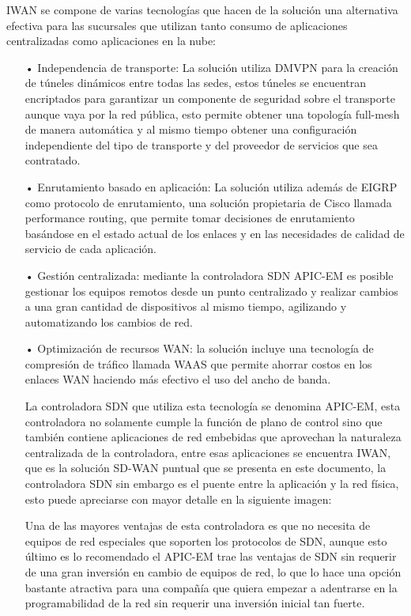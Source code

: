 IWAN se compone de varias tecnologías que hacen de la solución una alternativa efectiva para las sucursales que utilizan tanto consumo de aplicaciones centralizadas como aplicaciones en la nube:


\begin{itemize}
\item[•]Independencia de transporte: La solución utiliza DMVPN para la creación de túneles dinámicos entre todas las sedes, estos túneles se encuentran encriptados para garantizar un componente de seguridad sobre el transporte aunque vaya por la red pública, esto permite obtener una topología full-mesh de manera automática y al mismo tiempo obtener una configuración independiente del tipo de transporte y del proveedor de servicios que sea contratado.
\item[•]Enrutamiento basado en aplicación: La solución utiliza además de EIGRP como protocolo de enrutamiento, una solución propietaria de Cisco llamada performance routing, que permite tomar decisiones de enrutamiento basándose en el estado actual de los enlaces y en las necesidades de calidad de servicio de cada aplicación.
\item[•]Gestión centralizada: mediante la controladora SDN APIC-EM es posible gestionar los equipos remotos desde un punto centralizado y realizar cambios a una gran cantidad de dispositivos al mismo tiempo, agilizando y automatizando los cambios de red.
\item[•]Optimización de recursos WAN: la solución incluye una tecnología de compresión de tráfico llamada WAAS que permite ahorrar costos en los enlaces WAN haciendo más efectivo el uso del ancho de banda.

La controladora SDN que utiliza esta tecnología se denomina APIC-EM, esta controladora no solamente cumple la función de plano de control sino que también contiene aplicaciones de red embebidas que aprovechan la naturaleza centralizada de la controladora, entre esas aplicaciones se encuentra IWAN, que es la solución SD-WAN puntual que se presenta en este documento, la controladora SDN sin embargo es el puente entre la aplicación y la red física, esto puede apreciarse con mayor detalle en la siguiente imagen:


Una de las mayores ventajas de esta controladora es que no necesita de equipos de red especiales que soporten los protocolos de SDN, aunque esto último es lo recomendado el APIC-EM trae las ventajas de SDN sin requerir de una gran inversión en cambio de equipos de red, lo que lo hace una opción bastante atractiva para una compañía que quiera empezar a adentrarse en la programabilidad de la red sin requerir una inversión inicial tan fuerte.
\end{itemize}

